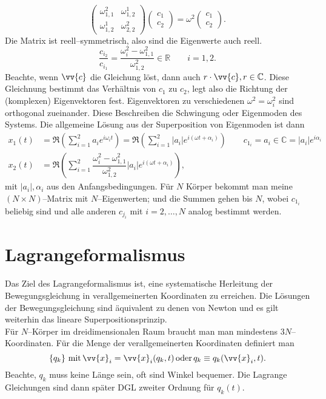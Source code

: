 \documentclass[a4paper,12pt]{article}
\numberwithin{equation}{section}
\begin{document}
\[ 
        \left(\begin{matrix}
                        \omega ^2_{1,1}&\omega ^1_{1,2}\\\omega ^1_{1,2}&\omega ^2_{2,2}
        \end{matrix}\right)\begin{pmatrix}
                c_1\\c_2
        \end{pmatrix}=\omega ^2 \begin{pmatrix}
                c_1\\c_2
        \end{pmatrix}
.\] 
Die Matrix ist reell--symmetrisch, also sind die Eigenwerte auch reell. 
\[ 
        \dfrac{c _{i_2}}{c _{i_1}}=\dfrac{\omega ^2_{i}-\omega ^2_{1,1}}{\omega ^2_{1,2}} \in \mathbb{R}\qquad i=1,2
.\] 
Beachte, wenn $\vv{c}$ die Gleichung löst, dann auch $r\cdot \vv{c},r \in \mathbb{C}$. Diese Gleichnung bestimmt das Verhältnis von $c_1$ zu $c_2$, legt also die Richtung der (komplexen) Eigenvektoren fest. Eigenvektoren zu verschiedenen $\omega ^2=\omega ^2_i$ sind orthogonal zueinander. Diese Beschreiben die Schwingung oder Eigenmoden des Systems. Die allgemeine Lösung aus der Superposition von Eigenmoden ist dann
\begin{align*}
        x_1(t)&=\mathfrak{R}\left(\sum_{i=1}^{2}a_ie^{i\omega _it}\right)=\mathfrak{R}\left(\sum_{i=1}^{2}|a_i|e^{i(\omega t+\alpha_i )}\right)\qquad c _{1_i}=a_i \in \mathbb{C}=|a_i|e^{i\alpha _i}\\
        x_2(t)&=\mathfrak{R}\left(\sum_{i=1}^{2}\dfrac{\omega _i^2-\omega _{1,1}^2}{\omega _{1,2}^2}|a_i|e^{i(\omega t+\alpha _i)}\right)
,\end{align*}
mit $|a_i|,\alpha _i$ aus den Anfangsbedingungen. Für $N$ Körper bekommt man meine $(N\times N)$--Matrix mit $N$--Eigenwerten; und die Summen gehen bis $N$, wobei $c _{1_i}$ beliebig sind und alle anderen $c _{j_i}$ mit $i=2,\hdots ,N$ analog bestimmt werden.

\newpage
\section{Lagrangeformalismus}
Das Ziel des Lagrangeformalismus ist, eine systematische Herleitung der Bewegungsgleichung in verallgemeinerten Koordinaten zu erreichen. Die Lösungen der Bewegungsgleichung sind äquivalent zu denen von Newton und es gilt weiterhin das lineare Superpositionsprinzip.\\\indent
Für $N$--Körper im dreidimensionalen Raum braucht man man mindestens $3N$--Koordinaten. Für die Menge der verallgemeinerten Koordinaten definiert man
\[ 
        \left\{q_k\right\}\,\text{mit}\,\vv{x}_i=\vv{x}_i(q_k,t)\,\text{oder}\,q_k\equiv q_k(\vv{x}_i,t)
.\] 
Beachte, $q_k$ muss keine Länge sein, oft sind Winkel bequemer. Die Lagrange Gleichungen sind dann später DGL zweiter Ordnung für $q_k(t)$.
\end{document}
